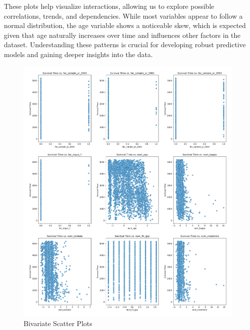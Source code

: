 \clearpage
\noindent These plots help visualize interactions, allowing us to explore possible correlations, trends, and dependencies. While most variables appear to follow a normal distribution, the age variable shows a noticeable skew, which is expected given that age naturally increases over time and influences other factors in the dataset. Understanding these patterns is crucial for developing robust predictive models and gaining deeper insights into the data.
\begin{figure}[h]
    \centering
    \includegraphics[scale=0.33]{Figures/EDA/scatter3.png}
    \caption{Bivariate Scatter Plots}
    \label{fig:scatter1}
\end{figure}

